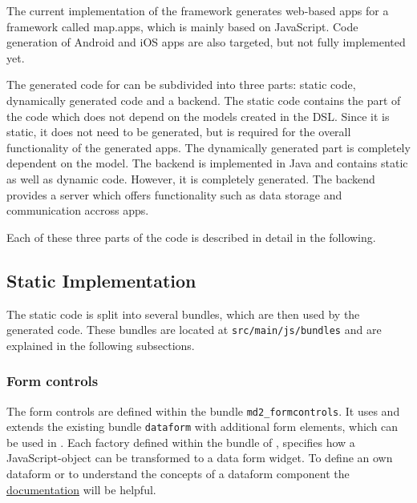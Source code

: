
\lstset{language=Simple}

The current implementation of the \MD framework generates web-based apps for a framework called map.apps, which is mainly based on JavaScript. Code generation of Android and iOS apps are also targeted, but not fully implemented yet.

The generated code for \mapapps can be subdivided into three parts: static \mapapps code, dynamically generated \mapapps code and a backend. The static \mapapps code contains the part of the code which does not depend on the models created in the \MD DSL. Since it is static, it does not need to be generated, but is required for the overall functionality of the generated apps. The dynamically generated part is completely dependent on the model. The backend is implemented in Java and contains static as well as dynamic code. However, it is completely generated. The backend provides a server which offers functionality such as data storage and communication accross apps.

Each of these three parts of the code is described in detail in the following.


\subsection{Static \mapapps Implementation}

The static \mapapps code is split into several bundles, which are then used by the generated \mapapps code. These bundles are located at \lstinline!src/main/js/bundles! and are explained in the following subsections.

\subsubsection{Form controls}

The form controls are defined within the bundle \lstinline!md2_formcontrols!. It uses and extends the existing \mapapps bundle \lstinline|dataform| with additional form elements, which can be used in \MD. Each factory defined within the bundle of \MD, specifies how a JavaScript-object can be transformed to a data form widget. To define an own dataform or to understand the concepts of a dataform component the \href{http://developernetwork.conterra.de/documentation/31/developers/dataform}{\mapapps documentation} will be helpful.

